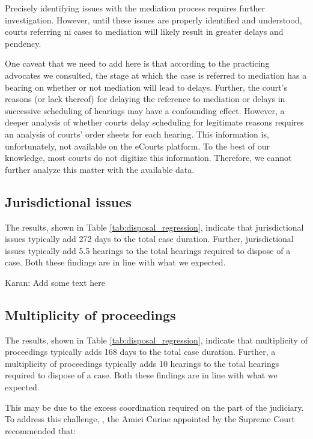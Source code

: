 \documentclass[12pt,a4paper]{article}
\begin{document}
	Precisely identifying issues with the mediation process requires further investigation. However, until these issues are properly identified and understood, courts referring \gls{ni} cases to mediation will likely result in greater delays and pendency.
	
	One caveat that we need to add here is that according to the practicing advocates we consulted, the stage at which the case is referred to mediation has a bearing on whether or not mediation will lead to delays. Further, the court's reasons (or lack thereof) for delaying the reference to mediation or delays in successive scheduling of hearings may have a confounding effect. However, a deeper analysis of whether courts delay scheduling for legitimate reasons requires an analysis of courts' order sheets for each hearing. This information is, unfortunately, not available on the eCourts platform. To the best of our knowledge, most courts do not digitize this information. Therefore, we cannot further analyze this matter with the available data.
	
	\subsection{Jurisdictional issues}
	\label{sec:jurisd-issu}
	
	The results, shown in Table \ref{tab:disposal_regression}, indicate that jurisdictional issues typically add 272 days to the total case duration. Further, jurisdictional issues typically add 5.5 hearings to the total hearings required to dispose of a case. Both these findings are in line with what we expected.
	
	{\color{red}Karan: Add some text here}
	
	\subsection{Multiplicity of proceedings}
	\label{sec:mult-proc}
	
	The results, shown in Table \ref{tab:disposal_regression}, indicate that multiplicity of proceedings typically adds 168 days to the total case duration. Further, a multiplicity of proceedings typically adds 10 hearings to the total hearings required to dispose of a case. Both these findings are in line with what we expected.
	
	This may be due to the excess coordination required on the part of the judiciary. To address this challenge, , the Amici Curiae appointed by the Supreme Court recommended that:
	
\end{document}
